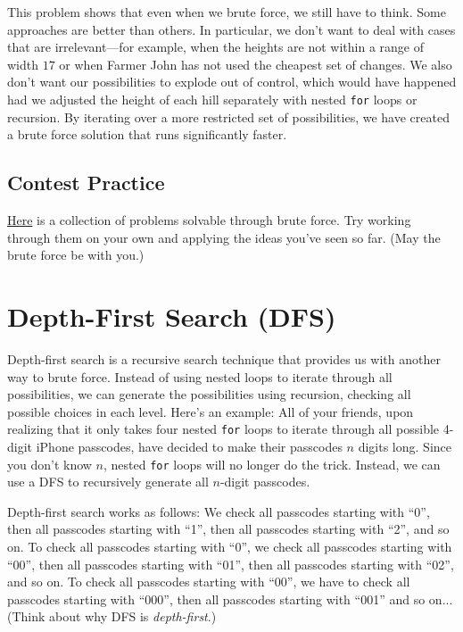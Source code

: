 This problem shows that even when we brute force, we still have to think. Some approaches are better than others. In particular, we don't want to deal with cases that are irrelevant---for example, when the heights are not within a range of width $17$ or when Farmer John has not used the cheapest set of changes. We also don't want our possibilities to explode out of control, which would have happened had we adjusted the height of each hill separately with nested \texttt{for} loops or recursion. By iterating over a more restricted set of possibilities, we have created a brute force solution that runs significantly faster.

\subsection{Contest Practice}

\href{http://codeforces.com/group/5tN48zOVvQ/contest/204642}{Here} is a collection of problems solvable through brute force. Try working through them on your own and applying the ideas you've seen so far. (May the brute force be with you.)

\section{Depth-First Search (DFS)}

Depth-first search is a recursive search technique that provides us with another way to brute force. Instead of using nested loops to iterate through all possibilities, we can generate the possibilities using recursion, checking all possible choices in each level. Here's an example: All of your friends, upon realizing that it only takes four nested \texttt{for} loops to iterate through all possible 4-digit iPhone passcodes, have decided to make their passcodes $n$ digits long. Since you don't know $n$, nested \texttt{for} loops will no longer do the trick. Instead, we can use a DFS to recursively generate all $n$-digit passcodes.

Depth-first search works as follows: We check all passcodes starting with ``0'', then all passcodes starting with ``1'', then all passcodes starting with ``2'', and so on. To check all passcodes starting with ``0'', we check all passcodes starting with ``00'', then all passcodes starting with ``01'', then all passcodes starting with ``02'', and so on. To check all passcodes starting with ``00'', we have to check all passcodes starting with ``000'', then all passcodes starting with ``001'' and so on... (Think about why DFS is \emph{depth-first}.)

